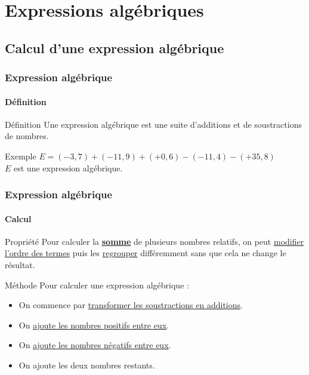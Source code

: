 \documentclass{beamer}
\begin{document}
\section{Expressions algébriques}

\subsection{Calcul d'une expression algébrique}

\begin{frame}
	\frametitle{Expression algébrique}  
	\framesubtitle{Définition}	
	
	\begin{block}{Définition}
		Une expression algébrique est une suite d'additions et de soustractions de nombres.
	\end{block}
	
	\begin{exampleblock}{Exemple}
		$E = (-3,7) + (-11,9) + (+0,6) - (-11,4) - (+35,8)$\\
		
		$E$ est une expression algébrique.
	\end{exampleblock}
\end{frame}

\begin{frame}
	\frametitle{Expression algébrique}  
	\framesubtitle{Calcul }
	
	\begin{block}{Propriété}
		Pour calculer la \textbf{\underline{somme}} de plusieurs nombres relatifs, on peut \underline{modifier l'ordre des termes} puis les \underline{regrouper} différemment sans que cela ne change le résultat.\pause
	\end{block}	
	
	\begin{block}{Méthode}
		Pour calculer une expression algébrique :
		\begin{itemize}
			\item On commence par \underline{transformer les soustractions en additions}.
			\item On \underline{ajoute les nombres positifs entre eux}. 
			\item On \underline{ajoute les nombres négatifs entre eux}.
			\item On ajoute les deux nombres restants.
		\end{itemize}
	\end{block}
\end{frame}
\end{document}
